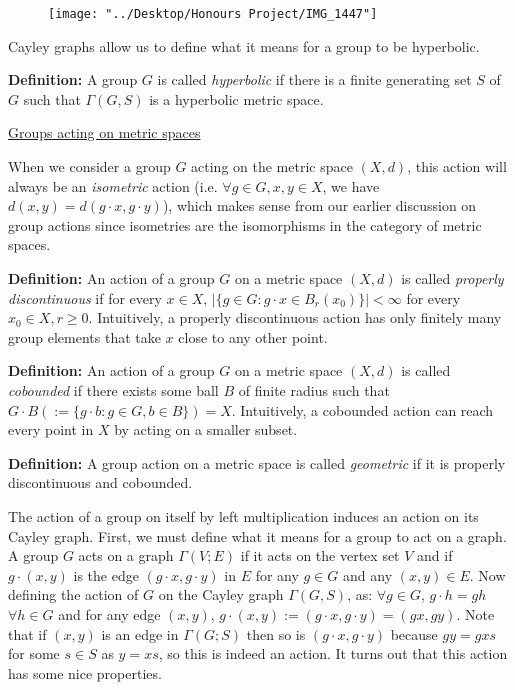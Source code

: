 \documentclass[12pt]{article}
\newcommand{\vs}{\vskip10pt}
\begin{document}
\begin{figure}
	\centering
	\texttt{[image: "../Desktop/Honours Project/IMG\_1447"]}
	\caption{}
	\label{fig:img1447}
\end{figure}
	Cayley graphs allow us to define what it means for a group to be hyperbolic. 
	
	\vs 
	
	\textbf{Definition: } A group $G$ is called \textit{hyperbolic} if there is a finite generating set $S$ of $G$ such that $\Gamma(G, S)$ is a hyperbolic metric space. 
	
	\vs
	
	\underline{Groups acting on metric spaces}
	
	\vs 
	
	When we consider a group $G$ acting on the metric space $(X,d)$, this action will always be an \textit{isometric} action (i.e. $\forall g \in G, x,y \in X$, we have $d(x, y) = d(g \cdot x, g \cdot y)$), which makes sense from our earlier discussion on group actions since isometries are the isomorphisms in the category of metric spaces. 
	
	\vs 
	
	\textbf{Definition: } An action of a group $G$ on a metric space $(X,d)$ is called \textit{properly discontinuous} if for every $x \in X$, $\vert \{g \in G: g \cdot x \in B_r(x_0)\}\vert < \infty$ for every $x_0 \in X, r \geq 0$. Intuitively, a properly discontinuous action has only finitely many group elements that take $x$ close to any other point. 
	
	\vs 
	
	\textbf{Definition: } An action of a group $G$ on a metric space $(X,d)$ is called \textit{cobounded} if there exists some ball $B$ of finite radius such that $G\cdot B (:= \{g \cdot b: g \in G, b \in B\}) = X$. Intuitively, a cobounded action can reach every point in $X$ by acting on a smaller subset. 
	
	\vs 
	
	\textbf{Definition: } A group action on a metric space is called \textit{geometric} if it is properly discontinuous and cobounded.
	
	\vs 
	
	The action of a group on itself by left multiplication induces an action on its Cayley graph. First, we must define what it means for a group to act on a graph. A group $G$ acts on a graph $\Gamma(V;E)$ if it acts on the vertex set $V$ and if $g \cdot (x,y)$ is the edge $(g\cdot x, g \cdot y)$ in $E$ for any $g \in G$ and any $(x,y) \in E$. Now defining the action of $G$ on the Cayley graph $\Gamma(G, S)$, as: $\forall g \in G$, $g \cdot h = gh$ $\forall h \in G$ and for any edge $(x,y)$, $g \cdot (x,y) := (g \cdot x, g \cdot y) = (gx, gy)$. Note that if $(x,y)$ is an edge in $\Gamma(G;S)$ then so is $(g \cdot x, g \cdot y)$ because $gy = gxs$ for some $s \in S$ as $y = xs$, so this is indeed an action. It turns out that this action has some nice properties. 
	
\end{document}
